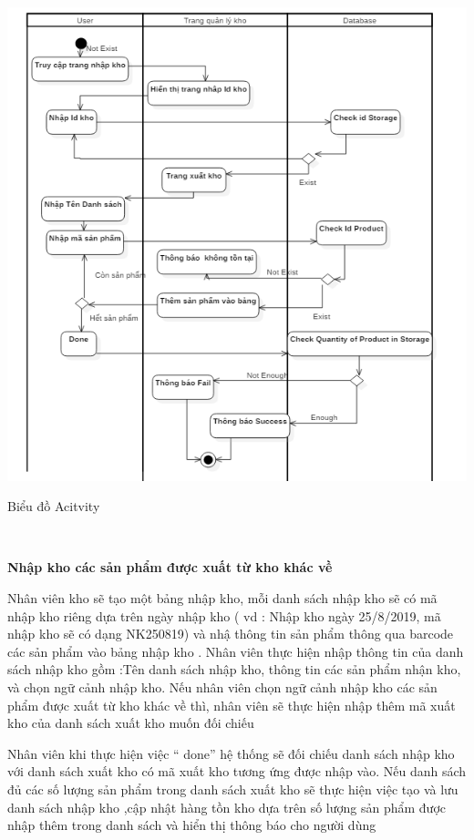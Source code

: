 \documentclass{article}
\begin{document}
\includegraphics[scale = 0.7]{32.png}\\
\fontsize{13}{20}\selectfont\caption{Biểu đồ Acitvity}\\


\pagebreak
\centering






\pagebreak

\fontsize{14}{20}\selectfont\textbf{Nhập kho các sản phẩm được xuất từ kho khác về}

\fontsize{13}{20}\selectfont

Nhân viên kho sẽ tạo một bảng nhập kho, mỗi danh sách nhập kho sẽ có mã nhập kho riêng dựa trên ngày nhập kho ( vd : Nhập kho ngày 25/8/2019, mã nhập kho sẽ có dạng NK250819) và nhậ thông tin sản phẩm thông qua barcode các sản phẩm vào bảng nhập kho . Nhân viên thực hiện nhập thông tin của danh sách nhập kho gồm :Tên danh sách nhập kho, thông tin các sản phẩm nhận kho, và chọn ngữ cảnh nhập kho.
Nếu nhân viên chọn ngữ cảnh nhập kho các sản phẩm được xuất từ kho khác về thì, nhân viên sẽ thực hiện nhập thêm mã xuất kho của danh sách xuất kho muốn đối chiếu
	
Nhân viên khi thực hiện việc “ done”  hệ thống sẽ đối chiếu danh sách nhập kho với danh sách xuất kho có mã xuất kho tương ứng được nhập vào. 
Nếu danh sách đủ các số lượng sản phẩm trong danh sách xuất kho sẽ thực hiện việc tạo và lưu danh sách nhập kho ,cập nhật hàng tồn kho dựa trên số lượng sản phẩm được nhập thêm trong danh sách và hiển thị thông báo cho người dùng
\end{document}
